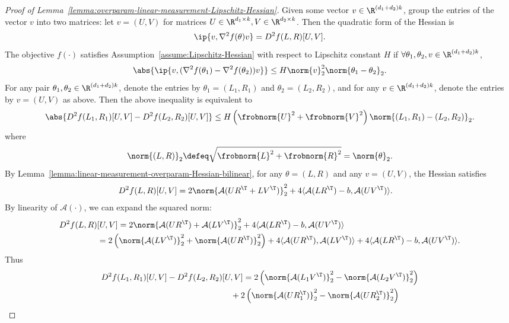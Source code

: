 \begin{proof}[Proof of Lemma~\ref{lemma:overparam-linear-measurement-Lipschitz-Hessian}]
    Given some vector $v\in \R^{(d_1 + d_2)k}$, group the entries of the vector $v$ into two matrices: let $v = (U, V)$ for matrices $U\in \R^{d_1\times k}, V\in \R^{d_2\times k}$. Then the quadratic form of the Hessian is
     \[
        \ip{v, \nabla^2 f(\theta) v} = D^2 f(L,R)[U,V].
     \]
     The objective $f(\cdot)$ satisfies Assumption~\ref{assume:Lipschitz-Hessian} with respect to Lipschitz constant $H$ if  $\forall \theta_1, \theta_2, v\in \R^{(d_1 + d_2)k}$,
     \[
        \abs{\ip{v, (\nabla^2 f(\theta_1)-\nabla^2 f(\theta_2)) v}} \leq H \norm{v}^2_2 \norm{\theta_1-\theta_2}_2.
     \]
     For any pair $\theta_1, \theta_2\in \R^{(d_1 + d_2)k}$, denote the entries by $\theta_1 = (L_1, R_1)$ and $\theta_2 = (L_2, R_2)$, and for any $v\in \R^{(d_1 + d_2)k}$, denote the entries by $v = (U, V)$ as above. Then the above inequality is equivalent to
     \[
        \abs{D^2f(L_1, R_1)[U,V] - D^2f(L_2, R_2)[U,V]} \leq H \left(\frobnorm{U}^2 + \frobnorm{V}^2 \right)\norm{(L_1, R_1)-(L_2, R_2)}_2.
     \]
     where
     \[
        \norm{(L,R)}_2 \defeq \sqrt{\frobnorm{L}^2 + \frobnorm{R}^2} = \norm{\theta}_2.
     \]
    By Lemma~\ref{lemma:linear-measurement-overparam-Hessian-bilinear}, for any $\theta = (L,R)$ and any $v=(U,V)$, the Hessian satisfies
    \begin{align*}
        D^2 f(L, R)[U,V] &= 2\norm{\mathcal{A}(UR^\T + LV^\T)}^2_2 + 4 \langle \mathcal{A}(LR^\T)-b, \mathcal{A}(UV^\T)\rangle.
    \end{align*}
    By linearity of $\mathcal{A}(\cdot)$, we can expand the squared norm:
    \begin{align*}
        D^2 f(L, R)&[U,V] = 2\norm{\mathcal{A}(UR^\T) + \mathcal{A}(LV^\T)}^2_2 + 4 \langle \mathcal{A}(LR^\T)-b, \mathcal{A}(UV^\T)\rangle\\
        &= 2\left(\norm{\mathcal{A}(LV^\T)}^2_2+\norm{\mathcal{A}(UR^\T)}^2_2\right) +4\langle \mathcal{A}(UR^\T), \mathcal{A}(LV^\T)\rangle+ 4 \langle \mathcal{A}(LR^\T)-b, \mathcal{A}(UV^\T)\rangle.
    \end{align*}
    Thus
    \begin{align}
        D^2f(L_1, R_1)[U,V] - D^2f(L_2, R_2)&[U,V] = 2\left(\norm{\mathcal{A}(L_1V^\T)}^2_2-\norm{\mathcal{A}(L_2V^\T)}^2_2\right)\label{eq:quadratic-diff-line-1}\\ 
        &\quad + 2\left(\norm{\mathcal{A}(UR_1^\T)}^2_2-\norm{\mathcal{A}(UR_2^\T)}^2_2\right)\label{eq:quadratic-diff-line-2}\\ 

\end{align}
\end{proof}
